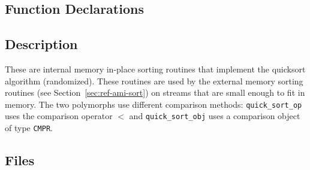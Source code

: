\subsection{Function Declarations}

  \btabb
      {}

      {}
  \etabb

\subsection{Description}

These are internal memory in-place sorting routines that implement the
quicksort algorithm (randomized).  These routines are used by the external memory sorting
routines (see Section~\ref{sec:ref-ami-sort}) on streams that are
small enough to fit in memory.  The two polymorphs use different
comparison methods: \lstinline|quick_sort_op| uses the comparison
operator $<$ and \lstinline|quick_sort_obj| uses a comparison object
of type \lstinline|CMPR|.




\tobewritten



\tobewritten




\tobewritten




\subsection{Files}
  \btabb
         {}
  \etabb

